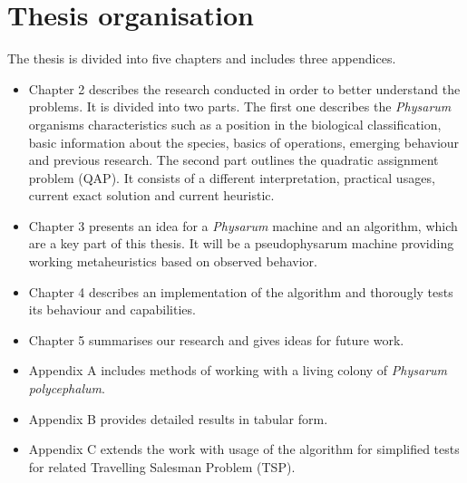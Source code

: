 \section{Thesis organisation}
\label{section:introduction_chapters}

The thesis is divided into five chapters and includes three appendices.

\begin{itemize}
  \item Chapter 2 describes the research conducted in order to better understand the problems. It is divided into two parts. The first one describes the \textit{Physarum} organisms characteristics such as a position in the biological classification, basic information about the species, basics of operations, emerging behaviour and previous research. The second part outlines the quadratic assignment problem (QAP). It consists of a different interpretation, practical usages, current exact solution and current heuristic.
  \item Chapter 3 presents an idea for a \textit{Physarum} machine and an algorithm, which are a key part of this thesis. It will be a pseudophysarum machine providing working metaheuristics based on observed behavior.
  \item Chapter 4 describes an implementation of the algorithm and thorougly tests its behaviour and capabilities.
  \item Chapter 5 summarises our research and gives ideas for future work.
  \item Appendix A includes methods of working with a living colony of \textit{Physarum polycephalum}.
  \item Appendix B provides detailed results in tabular form.
  \item Appendix C extends the work with usage of the algorithm for simplified tests for related Travelling Salesman Problem (TSP).
\end{itemize}
